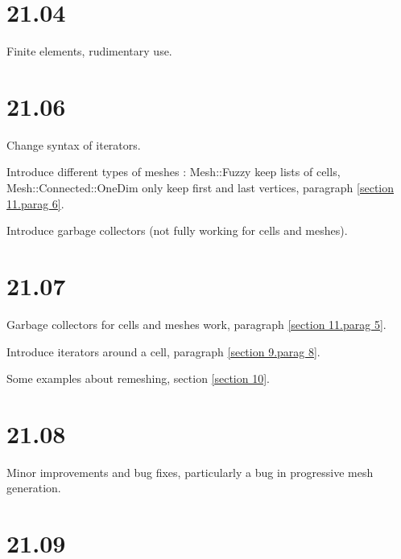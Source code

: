 \documentclass[a4paper]{scrreprt}
\def\numb{}
\newcommand\verm[1]{\textcolor{manif}{#1}}
\renewcommand\tt{\normalfont\ttfamily}
\begin{document}


















\section*{21.04}

\noindent Finite elements, rudimentary use.


\section*{21.06}

\noindent Change syntax of iterators.

\noindent Introduce different types of meshes :
{\small\tt\verm{Mesh}::Fuzzy} keep lists of cells,
{\small\tt\verm{Mesh}::Connected::OneDim} only keep first and last vertices,
paragraph \ref{\numb section 11.\numb parag 6}.

\noindent Introduce garbage collectors (not fully working for cells and meshes).


\section*{21.07}

\noindent Garbage collectors for cells and meshes work,
paragraph \ref{\numb section 11.\numb parag 5}.

\noindent Introduce iterators around a cell,
paragraph \ref{\numb section 9.\numb parag 8}.

\noindent Some examples about remeshing, section \ref{\numb section 10}.


\section*{21.08}

\noindent Minor improvements and bug fixes, particularly a bug in progressive mesh generation.


\section*{21.09}
\end{document}
